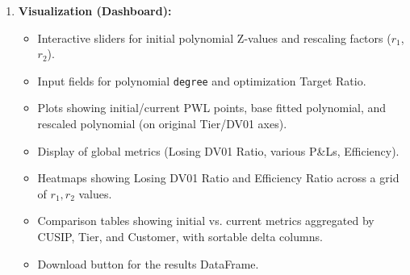 \documentclass[11pt, a4paper]{article}
\begin{document}
\begin{enumerate}
    \item \textbf{Visualization (Dashboard):}
        \begin{itemize}[nosep]
            \item Interactive sliders for initial polynomial Z-values and rescaling factors ($r_1$, $r_2$).
            \item Input fields for polynomial \texttt{degree} and optimization Target Ratio.
            \item Plots showing initial/current PWL points, base fitted polynomial, and rescaled polynomial (on original Tier/DV01 axes).
            \item Display of global metrics (Losing DV01 Ratio, various P\&Ls, Efficiency).
            \item Heatmaps showing Losing DV01 Ratio and Efficiency Ratio across a grid of $r_1, r_2$ values.
            \item Comparison tables showing initial vs. current metrics aggregated by CUSIP, Tier, and Customer, with sortable delta columns.
            \item Download button for the results DataFrame.
        \end{itemize}
\end{enumerate}
\end{document}
